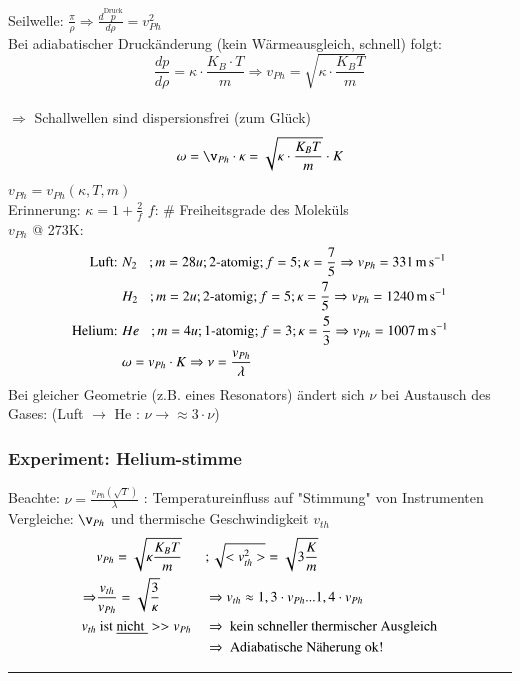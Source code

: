 Seilwelle: $ \frac{\pi}{\rho} \Rightarrow \frac{d\overset{\text{Druck}}{p}}{d\rho}=v^2_{Ph}$\\
Bei adiabatischer Druckänderung  (kein Wärmeausgleich, schnell) folgt:\\
$$ \frac{dp}{d\rho} = \kappa \cdot \frac{K_B \cdot T}{m} \Rightarrow \boxed{v_{Ph} = \sqrt{\kappa\cdot\frac{K_BT}{m}}}$$\\
$ \Rightarrow $ Schallwellen sind dispersionsfrei (zum Glück)
$$ \omega = \v_{Ph} \cdot \kappa = \sqrt{\kappa\cdot\frac{K_BT}{m}} \cdot K $$
$ v_{Ph} = v_{Ph}(\kappa,T,m) $\\
Erinnerung: $ \kappa = 1 + \frac{2}{f} $ \hspace{5mm} $ f $: $ \# $ Freiheitsgrade des Moleküls\\
\enter
$ v_{Ph} $ @ 273K:\\
\begin{align*}
\text{Luft: } &N_2 \hspace{3mm}; m=28u; 2\text{-atomig}; f=5; \kappa = \frac{7}{5} \Rightarrow v_{Ph}=\SI{331}{\meter\per\second}\\
&H_2 \hspace{3mm}; m=2u; 2\text{-atomig}; f=5; \kappa = \frac{7}{5} \Rightarrow v_{Ph}=\SI{1240}{\meter\per\second} \\
\text{Helium: } &He \hspace{3mm}; m=4u; 1\text{-atomig}; f=3; \kappa = \frac{5}{3} \Rightarrow v_{Ph}=\SI{1007}{\meter\per\second}\\
&\omega= v_{Ph} \cdot K \Rightarrow \nu = \frac{v_{Ph}}{\lambda}
\end{align*}
Bei gleicher Geometrie (z.B. eines Resonators) ändert sich $ \nu $ bei Austausch des Gases: (Luft $ \rightarrow $ He : $ \nu \rightarrow \approx 3 \cdot \nu$)\\
\subsubsection{Experiment: Helium-stimme}\enter
Beachte: $ \nu = \frac{v_{Ph}(\sqrt{T})}{\lambda} $ : Temperatureinfluss auf "Stimmung" von Instrumenten \\
Vergleiche: $ \v_{Ph} $ und thermische Geschwindigkeit $ v_{th} $\\
\begin{align*}
&v_{Ph} = \sqrt{\kappa\frac{K_BT}{m}} &&; \sqrt{<v_{th}^2>} = \sqrt{3\frac{K}{m}}\\
\Rightarrow &\frac{v_{th}}{v_{Ph}}=\sqrt{\frac{3}{\kappa}} &&\Rightarrow v_{th} \approx 1,3 \cdot v_{Ph} ... 1,4 \cdot v_{Ph}\\
 v_{th}&  \text{ ist \underline{nicht }}  >>  v_{Ph} &&\Rightarrow \text{ kein schneller thermischer Ausgleich}\\
 & &&\Rightarrow \text{ Adiabatische Näherung ok!}
\end{align*}
\begin{center}
	\rule{5cm}{.2pt}
\end{center}
